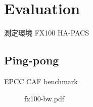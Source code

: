 \section{Evaluation}\label{sec:eval}

測定環境
FX100
HA-PACS


\subsection{Ping-pong}

EPCC CAF benchmark


\begin{figure}[tbh]
  \begin{center}
    \caption{fx100-bw.pdf}\label{fig:fx100-bw}
  \end{center}
\end{figure}

